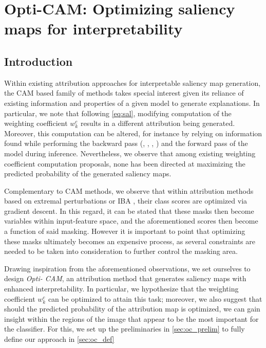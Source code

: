 \chapter{Opti-CAM: Optimizing saliency maps for interpretability}
\chaptertoc{}
\label{ch:opticam}
\section{Introduction}
\label{sec:intro}
\noindent Within existing attribution approaches for interpretable saliency map generation, the CAM 
\autocite{zhou2016learning} based family of methods takes special interest given its reliance of
existing  information and properties of a given model to generate explanations. In particular, we 
note that following \autoref{eq:sal}, modifying computation of the weighting coefficient 
$w_k^c$ results in a different attribution being generated. Moreover, this computation can be altered,
 for instance by relying on information found while performing the backward pass 
 (\cite{selvaraju2017grad}, \cite{chattopadhay2018grad}, \cite{axiombased}, 
 \cite{smilkov2017smoothgrad}) and the forward pass \autocite{wang2020score} of the model during 
 inference. Nevertheless, we observe that among existing weighting coefficient computation 
 proposals, none has been directed at maximizing the predicted probability of the generated 
 saliency maps.

Complementary to CAM methods, we observe that within attribution methods based on extremal 
perturbations \autocite{fong2019understanding} or IBA \autocite{schulz2020restricting}, 
their class scores are optimized via gradient descent. In this regard, it can 
be stated that these masks then become variables within input-feature space, and the aforementioned 
scores then become a function of said masking. However it is important to point that optimizing 
these masks ultimately becomes an expensive process, as several constraints are needed 
to be taken into consideration to further control the masking area.

Drawing inspiration from the aforementioned observations, we set ourselves to design \emph{Opti-
CAM}, an attribution method that generates saliency maps with enhanced interpretability. In 
particular, we hypothesize that the weighting coefficient $w_k^c$ can be optimized to attain this 
task; moreover, we also suggest that should the predicted probability of the attribution map is 
optimized, we can gain insight within the regions of the image that appear to be the most important 
for the classifier. For this, we set up the preliminaries in \autoref{sec:oc_prelim} to fully 
define our approach in \autoref{sec:oc_def}\\

